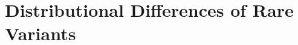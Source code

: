 \documentclass[header.tex]{subfiles}
\begin{document}
\chapter{Distributional Differences of Rare Variants}
\label{cha:distribuional_differences_of_rare_variants}




\end{document}
